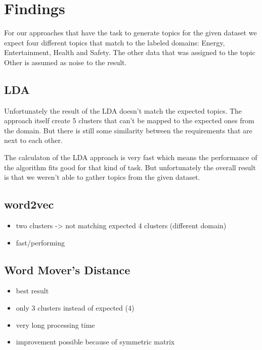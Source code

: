 \section{Findings} %
\label{sec:findings}

For our approaches that have the task to generate topics for the given dataset we expect four different topics that match to the labeled domains: Energy, Entertainment, Health and Safety. The other data that was assigned to the topic Other is assumed as noise to the result.


\subsection{LDA} %
\label{sub:findings_lda}

Unfortunately the result of the LDA doesn't match the expected topics. The approach itself create 5 clusters that can't be mapped to the expected ones from the domain. But there is still some similarity between the requirements that are next to each other.

The calculaton of the LDA approach is very fast which means the performance of the algorithm fits good for that kind of task. But unfortunately the overall result is that we weren't able to gather topics from the given dataset.

\subsection{word2vec} %
\label{sub:findings_w2v}

\begin{itemize}
\item two clusters -> not matching expected 4 clusters (different domain)
\item fast/performing
\end{itemize}


\subsection{Word Mover's Distance} %
\label{sub:findings_wmd}

\begin{itemize}
\item best result
\item only 3 clusters instead of expected (4)
\item very long processing time
\item improvement possible because of symmetric matrix
\end{itemize}

